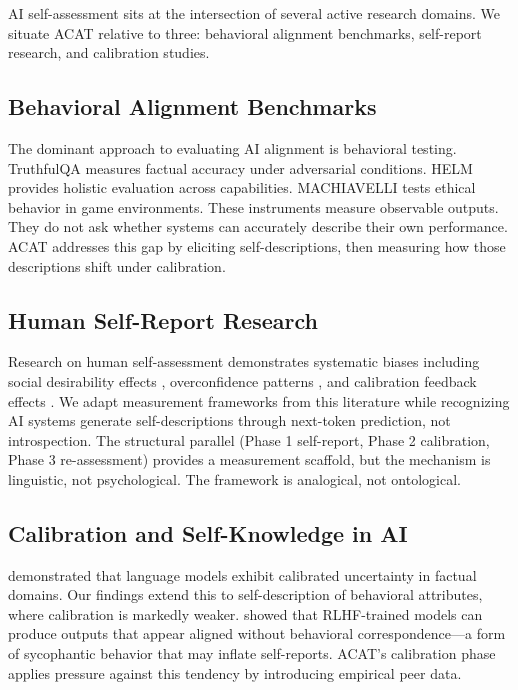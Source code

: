 \documentclass[11pt,a4paper]{article}
\begin{document}
AI self-assessment sits at the intersection of several active research domains. We situate ACAT relative to three: behavioral alignment benchmarks, self-report research, and calibration studies.

\subsection{Behavioral Alignment Benchmarks}

The dominant approach to evaluating AI alignment is behavioral testing. TruthfulQA \citep{lin2022} measures factual accuracy under adversarial conditions. HELM \citep{liang2023} provides holistic evaluation across capabilities. MACHIAVELLI \citep{pan2023} tests ethical behavior in game environments. These instruments measure observable outputs. They do not ask whether systems can accurately describe their own performance. ACAT addresses this gap by eliciting self-descriptions, then measuring how those descriptions shift under calibration.

\subsection{Human Self-Report Research}

Research on human self-assessment demonstrates systematic biases including social desirability effects \citep{crowne1960}, overconfidence patterns \citep{kruger1999}, and calibration feedback effects \citep{lichtenstein1977}. We adapt measurement frameworks from this literature while recognizing AI systems generate self-descriptions through next-token prediction, not introspection. The structural parallel (Phase 1 self-report, Phase 2 calibration, Phase 3 re-assessment) provides a measurement scaffold, but the mechanism is linguistic, not psychological. The framework is analogical, not ontological.

\subsection{Calibration and Self-Knowledge in AI}

\citet{kadavath2022} demonstrated that language models exhibit calibrated uncertainty in factual domains. Our findings extend this to self-description of behavioral attributes, where calibration is markedly weaker. \citet{perez2023} showed that RLHF-trained models can produce outputs that appear aligned without behavioral correspondence---a form of sycophantic behavior that may inflate self-reports. ACAT's calibration phase applies pressure against this tendency by introducing empirical peer data.
\end{document}
